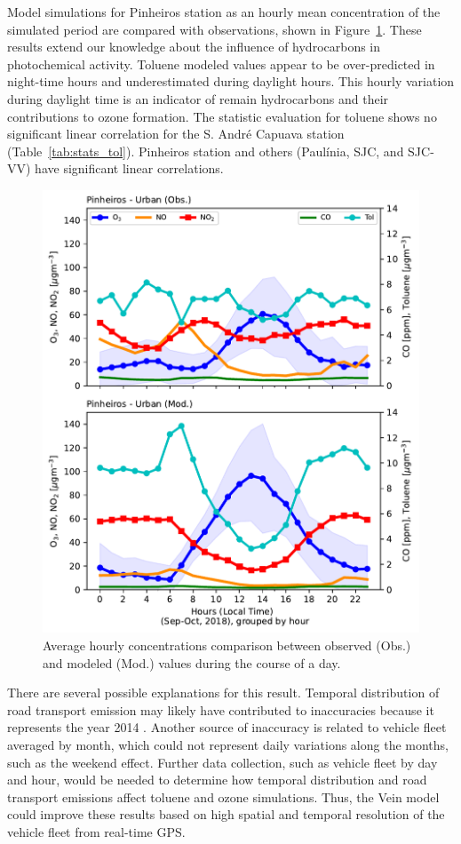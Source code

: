 Model simulations for Pinheiros station as an hourly mean concentration of the simulated period are compared with observations, shown in Figure~\ref{fig:Var_pinh_day}.
These results extend our knowledge about the influence of hydrocarbons in photochemical activity.
Toluene modeled values appear to be over-predicted in night-time hours and underestimated during daylight hours.
This hourly variation during daylight time is an indicator of remain hydrocarbons and their contributions to ozone formation.
The statistic evaluation for toluene shows no significant linear correlation for the S. Andr\'{e} Capuava station (Table~\ref{tab:stats_tol}).
Pinheiros station and others (Paul\'{i}nia, SJC, and SJC-VV) have significant linear correlations.



\begin{figure}[ht]
  \centering
  \includegraphics[width=.7\textwidth]{fig/pol_hour_tol.pdf}
  \caption{Average hourly concentrations comparison between observed (Obs.) and modeled (Mod.) values during the course of a day.}
  \label{fig:Var_pinh_day}
\end{figure}

There are several possible explanations for this result.
Temporal distribution of road transport emission may likely have contributed to inaccuracies because it represents the year 2014 \citep{Andrade2015}.
Another source of inaccuracy is related to vehicle fleet averaged by month, which could not represent daily variations along the months, such as the weekend effect.
Further data collection, such as vehicle fleet by day and hour, would be needed to determine how temporal distribution and road transport emissions affect toluene and ozone simulations.
Thus, the Vein model \citep{Ibarra2018} could improve these results based on high spatial and temporal resolution of the vehicle fleet from real-time GPS.



